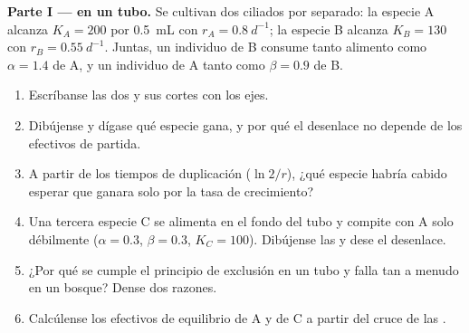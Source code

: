 \begin{problem}
\label{pb:b1:species-interactions:1}

\medskip
\noindent\textbf{Parte I ---  en un tubo.}
Se cultivan dos ciliados por separado: la especie A alcanza $K_A = 200$ por
\qty{0.5}{mL} con $r_A = \qty{0.8}{d^{-1}}$; la especie B alcanza
$K_B = 130$ con $r_B = \qty{0.55}{d^{-1}}$. Juntas, un individuo de B
consume tanto alimento como $\alpha = 1.4$ de A, y un individuo de A tanto
como $\beta = 0.9$ de B.
\begin{enumerate}
  \item Escríbanse las dos  y sus cortes con los ejes.
  \item Dibújense y dígase qué especie gana, y por qué el desenlace no
        depende de los efectivos de partida.
  \item A partir de los tiempos de duplicación ($\ln 2/r$), ¿qué especie
        habría cabido esperar que ganara solo por la tasa de crecimiento?
  \item Una tercera especie C se alimenta en el fondo del tubo y compite con
        A solo débilmente ($\alpha = 0.3$, $\beta = 0.3$, $K_C = 100$).
        Dibújense las  y dese el desenlace.
  \item ¿Por qué se cumple el principio de exclusión en un tubo y falla tan
        a menudo en un bosque? Dense dos razones.
  \item Calcúlense los efectivos de equilibrio de A y de C a partir del
        cruce de las .
\end{enumerate}


\end{problem}
